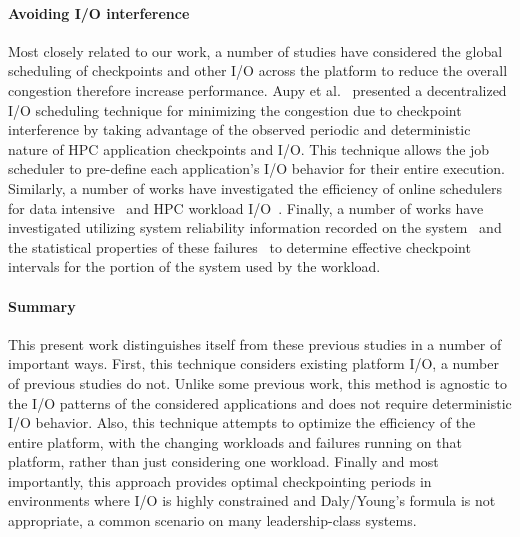 \paragraph{Avoiding I/O interference}

Most closely related to our work, a number of studies have considered the
global scheduling of checkpoints and other I/O across the platform to reduce
the overall congestion therefore increase performance.  Aupy et
al.~\cite{Aupy:2017:Periodic} presented a decentralized I/O scheduling
technique for minimizing the congestion due to checkpoint interference by
taking advantage of the observed periodic and deterministic nature of HPC
application checkpoints and I/O.  This technique allows the job scheduler to
pre-define each application’s I/O behavior for their entire execution.
Similarly, a number of works have investigated the efficiency of online
schedulers for data intensive~\cite{Groot2013,Sim:2015:AnalyzeThis} and HPC
workload
I/O~\cite{Dorier2015,Gainaru:2016:Scheduling,Zhou:2015:IOAware,Herbein2017}.
Finally, a number of works have investigated utilizing system reliability
information recorded on the system~\cite{Oliner:2006:Cooperative} and the
statistical properties of these failures~\cite{Tiwari:2014:Lazy} to determine
effective checkpoint intervals for the portion of the system used by the
workload.

\paragraph{Summary}

This present work distinguishes itself from these previous studies in a number
of important ways.  First, this technique considers existing platform I/O, a
number of previous studies do not.  Unlike some previous work, this method is
agnostic to the I/O patterns of the considered applications and does not
require deterministic I/O behavior.  Also, this technique attempts to optimize
the efficiency of the entire platform, with the changing workloads and failures
running on that platform, rather than just considering one workload. Finally
and most importantly, this approach provides optimal checkpointing periods in
environments where I/O is highly constrained and Daly/Young's formula is not
appropriate, a common scenario on many leadership-class systems.
